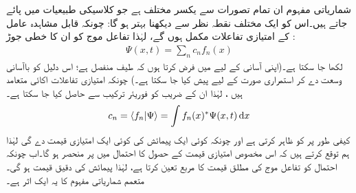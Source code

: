 شماریاتی مفہوم ان تمام تصورات سے یکسر مختلف ہے جو کلاسیکی طبیعیات میں پائے جاتے ہیں۔اس کو ایک مختلف نقطہ نظر سے دیکھنا بہتر ہو گا: چونکہ  قابل مشاہدہ عامل کے امتیازی تفاعلات مکمل ہوں گے،  لہٰذا تفاعل موج کو ان کا   خطی جوڑ :
\begin{align}
\Psi(x,t) = \sum_{n} c_{n}f_{n}(x)
\end{align}
لکھا جا سکتا ہے۔(اپنی آسانی کے لیے میں فرض کرتا ہوں کہ طیف منفصل ہے؛ اس دلیل کو باآسانی وسعت دے کر استمراری صورت کے لیے پیش کیا جا سکتا ہے۔)  چونکہ امتیازی تفاعلات اکائی متعامد ہیں ، لہٰذا ان کے  ضریب  کو فوریئر ترکیب سے حاصل کیا جا سکتا ہے۔
\begin{align}\label{مساوات_قواعد_فوریئر_ترکیب_عددی_سر}
c_{n} = \langle f_{n} | \Psi \rangle = \int f_{n}(x)^{*} \Psi(x,t)\dif x
\end{align}
کیفی طور پر  کو  ظاہر کرتی ہے اور چونکہ کوئی ایک پیمائش  کی کوئی ایک امتیازی قیمت دے گی لہٰذا ہم توقع کرتے ہیں کہ اس مخصوص امتیازی قیمت  کے حصول کا احتمال  میں پر منحصر ہو گا۔اب چونکہ احتمال کو تفاعل موج کی مطلق قیمت کا مربع تعین کرتا ہے،  لہٰذا پیمائش کی  دقیق  قیمت  ہو گی۔ متعمم شماریاتی مفہوم کا یہ ایک اثر ہے۔

